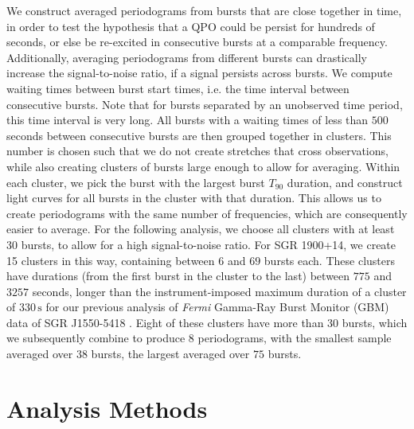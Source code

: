 \documentclass[numberedappendix]{emulateapj}
\begin{document}
We construct averaged periodograms from bursts that are close together in time, in order to test the hypothesis that a QPO could be persist for hundreds of seconds, or else be re-excited in consecutive bursts at a comparable frequency. Additionally, averaging periodograms from different bursts can drastically increase the signal-to-noise ratio, if a signal persists across bursts. We compute waiting times between burst start times, i.e. the time interval between consecutive bursts. Note that for bursts separated by an unobserved time period, this time interval is very long. All bursts with a waiting times of less than $500$ seconds between consecutive bursts are then grouped together in clusters. This number is chosen such that we do not create stretches that cross observations, while also creating clusters of bursts large enough to allow for averaging. Within each cluster, we pick the burst with the largest burst $T_{90}$ duration, and construct light curves for all bursts in the cluster with that duration. This allows us to create periodograms with the same number of frequencies, which are consequently easier to average. For the following analysis, we choose all clusters with at least 30 bursts, to allow for a high signal-to-noise ratio.
For SGR 1900+14, we create 15 clusters in this way, containing between $6$ and $69$ bursts each. These clusters have durations (from the first burst in the cluster to the last) between $775$ and $3257$ seconds, longer than the instrument-imposed maximum duration of a cluster of $330 \, \mathrm{s}$ for our previous analysis of {\it Fermi} Gamma-Ray Burst Monitor (GBM) data of SGR J1550-5418 \citep{huppenkothen14}. Eight of these clusters have more than $30$ bursts, which we subsequently combine to produce 8 periodograms, with the smallest sample averaged over $38$ bursts, the largest averaged over $75$ bursts.

\section{Analysis Methods}
\label{sec:analysis}
\end{document}
